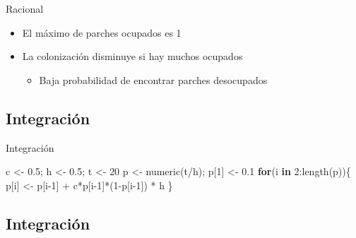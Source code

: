 \documentclass[
  11pt,
  ignorenonframetext,
]{beamer}
\newenvironment{Shaded}{}{}
\newcommand{\ControlFlowTok}[1]{\textcolor[rgb]{0.00,0.44,0.13}{\textbf{#1}}}
\newcommand{\DecValTok}[1]{\textcolor[rgb]{0.25,0.63,0.44}{#1}}
\newcommand{\FloatTok}[1]{\textcolor[rgb]{0.25,0.63,0.44}{#1}}
\newcommand{\FunctionTok}[1]{\textcolor[rgb]{0.02,0.16,0.49}{#1}}
\newcommand{\NormalTok}[1]{#1}
\newcommand{\OtherTok}[1]{\textcolor[rgb]{0.00,0.44,0.13}{#1}}
\newcommand{\SpecialCharTok}[1]{\textcolor[rgb]{0.25,0.44,0.63}{#1}}
\providecommand{\tightlist}{%
  \setlength{\itemsep}{0pt}\setlength{\parskip}{0pt}}
\begin{document}
\begin{frame}{Racional}
\begin{itemize}
\item
  El máximo de parches ocupados es 1
\item
  La colonización disminuye si hay muchos ocupados

  \begin{itemize}
  \tightlist
  \item
    Baja probabilidad de encontrar parches desocupados
  \end{itemize}
\end{itemize}
\end{frame}

\hypertarget{integraciuxf3n}{%
\subsection{Integración}\label{integraciuxf3n}}

\begin{frame}[fragile]{Integración}
\begin{Shaded}
\begin{Highlighting}[]
\NormalTok{c }\OtherTok{\textless{}{-}} \FloatTok{0.5}\NormalTok{; h }\OtherTok{\textless{}{-}} \FloatTok{0.5}\NormalTok{; t }\OtherTok{\textless{}{-}} \DecValTok{20}
\NormalTok{p }\OtherTok{\textless{}{-}} \FunctionTok{numeric}\NormalTok{(t}\SpecialCharTok{/}\NormalTok{h); p[}\DecValTok{1}\NormalTok{] }\OtherTok{\textless{}{-}} \FloatTok{0.1}
\ControlFlowTok{for}\NormalTok{(i }\ControlFlowTok{in} \DecValTok{2}\SpecialCharTok{:}\FunctionTok{length}\NormalTok{(p))\{}
\NormalTok{  p[i] }\OtherTok{\textless{}{-}}\NormalTok{ p[i}\DecValTok{{-}1}\NormalTok{] }\SpecialCharTok{+}\NormalTok{ c}\SpecialCharTok{*}\NormalTok{p[i}\DecValTok{{-}1}\NormalTok{]}\SpecialCharTok{*}\NormalTok{(}\DecValTok{1}\SpecialCharTok{{-}}\NormalTok{p[i}\DecValTok{{-}1}\NormalTok{]) }\SpecialCharTok{*}\NormalTok{ h}
\NormalTok{\}}
\end{Highlighting}
\end{Shaded}
\end{frame}

\hypertarget{integraciuxf3n-1}{%
\subsection{Integración}\label{integraciuxf3n-1}}
\end{document}
